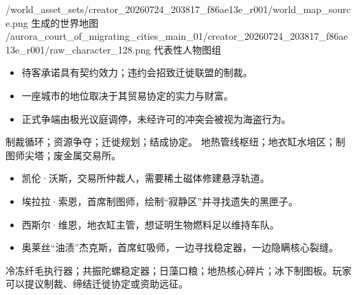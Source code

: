 \documentclass[10pt]{article}
\begin{document}
\clearpage
{}

\vspace{7pt}
\worldvisuals
  {\evidencepath/world_asset_sets/creator_20260724_203817_f86ae13e_r001/world_map_source.png}
  {生成的世界地图}
  {\evidencepath/aurora_court_of_migrating_cities_main_01/creator_20260724_203817_f86ae13e_r001/raw_character_128.png}
  {代表性人物图组}

\begin{minipage}[t]{0.48\linewidth}
\begin{itemize}
\item 待客承诺具有契约效力；违约会招致迁徙联盟的制裁。
\item 一座城市的地位取决于其贸易协定的实力与财富。
\item 正式争端由极光议庭调停，未经许可的冲突会被视为海盗行为。
\end{itemize}
制裁循环；资源争夺；迁徙规划；结成协定。
地热管线枢纽；地衣缸水培区；制图师尖塔；废金属交易所。
\end{minipage}\hfill
\begin{minipage}[t]{0.48\linewidth}
\begin{itemize}
\item 凯伦·沃斯，交易所仲裁人，需要稀土磁体修建悬浮轨道。
\item 埃拉拉·索恩，首席制图师，绘制“寂静区”并寻找遗失的黑匣子。
\item 西斯尔·维恩，地衣缸主管，想证明生物燃料足以维持车队。
\item 奥莱丝“油渍”杰克斯，首席虹吸师，一边寻找稳定器，一边隐瞒核心裂缝。
\end{itemize}
冷冻纤毛执行器；共振陀螺稳定器；日藻口粮；地热核心碎片；冰下制图板。玩家可以提议制裁、缔结迁徙协定或资助远征。
\end{minipage}
\end{document}
